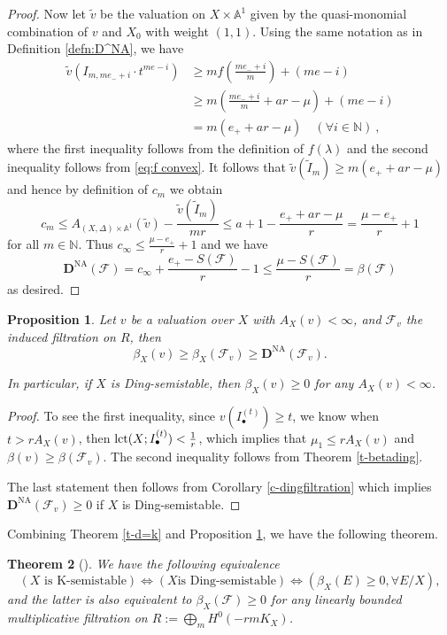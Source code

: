 \documentclass[12pt,reqno]{amsart}%
\newcommand{\bA}{{\mathbb{A} }}
\newcommand{\bN}{{\mathbb{N} }}
\newcommand{\tv}{{\tilde{v}}}
\newcommand{\tI}{{\tilde{I}}}
\newcommand{\cF}{\mathcal{F}}
\newcommand{\DNA}{\mathbf{D}^{\mathrm{NA}}}
\newtheorem{thm}{Theorem}[section]
\newtheorem{prop}[thm]{Proposition}
\theoremstyle{definition}
\theoremstyle{remark}
\newcommand{\lct}{{\rm lct}}
\begin{document}
\begin{proof}
Now let $\tv$ be the valuation on $X\times \bA^1$ given by the quasi-monomial combination of $v$ and $X_0$ with weight $(1,1)$. Using the same notation as in Definition \ref{defn:D^NA}, we have
\begin{align*}
    \tv(I_{m,me_-+i}\cdot t^{me-i}) & \ge m f\left( \frac{me_-+i}{m} \right) +(me-i) \\
     & \ge m\left(\frac{me_-+i}{m}+ar-\mu\right)+(me-i) \\
     & = m(e_++ar-\mu) \quad (\forall i\in\bN)\ ,
\end{align*}
where the first inequality follows from the definition of $f(\lambda)$ and the second inequality follows from \eqref{eq:f convex}. It follows that $\tv(\tI_m)\ge m(e_++ar-\mu)$ and hence by definition of $c_m$ we obtain
\[
c_m \le A_{(X,\Delta)\times \bA^1}(\tv)-\frac{\tv(\tI_m)}{mr}\le a+1-\frac{e_+ +ar-\mu}{r}=\frac{\mu-e_+}{r}+1
\]
for all $m\in\bN$. Thus $c_\infty\le \frac{\mu-e_+}{r}+1$ and we have
\[
\DNA(\cF) = c_\infty + \frac{e_+ - S(\cF)}{r} -1 \le \frac{\mu-S(\cF)}{r} = \beta(\cF)
\]
as desired.

\end{proof}

\begin{prop}\label{l-betading}
Let $v$ be a valuation over $X$ with $A_{X}(v)<\infty$, and $\cF_v$ the induced filtration on $R$, then 
$$\beta_X(v)\ge \beta_X(\cF_v) \ge \DNA(\cF_v).$$ 

In particular, if $X$ is Ding-semistable, then $\beta_X(v)\ge 0$ for any $A_{X}(v)<\infty$.
\end{prop} 
\begin{proof}To see the first inequality, since $v(I_\bullet^{(t)})\ge t$, we know when $t>rA_X(v)$, then $\lct(X;I_\bullet^{(t)})<\frac{1}{r}$, which implies that $\mu_{1}\le rA_X(v)$ and $\beta(v)\ge \beta(\cF_v)$. The second inequality follows from Theorem \ref{t-betading}.

The last statement then follows from Corollary \ref{c-dingfiltration} which implies $\DNA(\cF_v)\ge 0$ if $X$ is Ding-semistable. 
\end{proof}

Combining Theorem \ref{t-d=k} and Proposition \ref{l-betading}, we have the following theorem.

 \begin{thm}[{\cite{Li17,Fuj19b, XZ19}}]\label{t-maintheorem2} 
 We have the following equivalence
\[
(X\mbox{ is K-semistable})\Longleftrightarrow(X \mbox{is Ding-semistable})\Longleftrightarrow (\beta_X(E)\ge 0, \forall E /X),
\]
and the latter is also equivalent to $\beta_X(\cF)\ge 0$ for any linearly bounded multiplicative filtration on $R:=\bigoplus_m H^0(-rmK_X)$.
 \end{thm}
\end{document}
